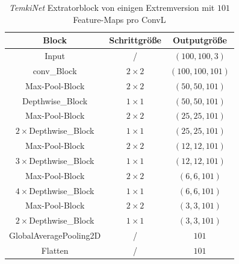 \documentclass[12pt,a4paper]{scrartcl}
\numberwithin{equation}{section}
\begin{document}
\begin{table}[h!]
	\centering
	\begin{tabular}{|c|c|c|}
		\hline
		Block & Schrittgröße & Outputgröße\\ \hline
		Input & / & $ (100, 100,3) $ \\ \hline
		conv\_Block &	$ 2\times2 $ &$ (100,100, 101) $\\ \hline
		 Max-Pool-Block  & $ 2\times2 $&$ (50,50, 101) $\\ \hline
		Depthwise\_Block  & $ 1\times1 $&$ (50,50, 101) $\\ \hline
		
		 Max-Pool-Block & $ 2\times2 $&$ (25,25, 101) $\\ \hline
		$ 2\times $Depthwise\_Block & $ 1\times1 $&$ (25,25, 101) $\\ \hline
		
		 Max-Pool-Block  & $ 2\times2 $&$ (12,12, 101) $\\ \hline
		$ 3\times $Depthwise\_Block & $ 1\times1 $&$ (12,12, 101) $\\ \hline
		
		 Max-Pool-Block  & $ 2\times2 $&$ (6,6, 101) $\\ \hline
		$ 4\times $Depthwise\_Block  & $ 1\times1 $&$ (6,6, 101) $\\ \hline
		
		 Max-Pool-Block   & $ 2\times2 $&$ (3,3, 101) $\\ \hline
		$ 2\times $Depthwise\_Block & $ 1\times1 $&$ (3,3, 101) $\\ \hline
		GlobalAveragePooling2D & / &$ 101 $ \\ \hline
		Flatten & / &$ 101 $ \\ \hline
		
	\end{tabular}
	\caption{\textit{TemkiNet} Extratorblock von einigen Extremversion  mit $ 101 $ Feature-Maps pro \ac{ConvL}}
	\label{tab:Temki_Architectur1}
\end{table}
 
\end{document}
